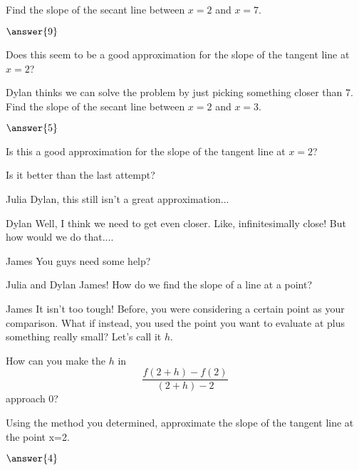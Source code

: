 \documentclass{ximera}
\begin{document}
\begin{question}
Find the slope of the secant line between $x = 2$ and $x = 7$.


$\answer{9}$

Does this seem to be a good approximation for the slope of the tangent line at $x = 2$?

\begin{multipleChoice}
\end{multipleChoice}

Dylan thinks we can solve the problem by just picking something closer than 7. Find the slope of the secant line between $x = 2$ and $x = 3$.

$\answer{5}$

Is this a good approximation for the slope of the tangent line at $x=2$?

\begin{multipleChoice}
\end{multipleChoice}

Is it better than the last attempt?

\begin{multipleChoice}
\end{multipleChoice}
\end{question}
\begin{dialogue}
\item[Julia] Dylan, this still isn't a great approximation...
\item[Dylan] Well, I think we need to get even closer. Like, infinitesimally close! But how would we do that....
\item[James] You guys need some help?
\item[Julia and Dylan] James! How do we find the slope of a line at a point?
\item[James] It isn't too tough! Before, you were considering a certain point as your comparison. What if instead, you used the point you want to evaluate at plus something really small? Let's call it $h$.
\end{dialogue}
\begin{question}
How can you make the $h$ in $$\frac{f(2+h)-f(2)}{(2+h)-2}$$ approach 0?
\begin{multipleChoice}
\end{multipleChoice}

Using the method you determined, approximate the slope of the tangent line at the point x=2.

$\answer{4}$

\end{question}
\end{document}
